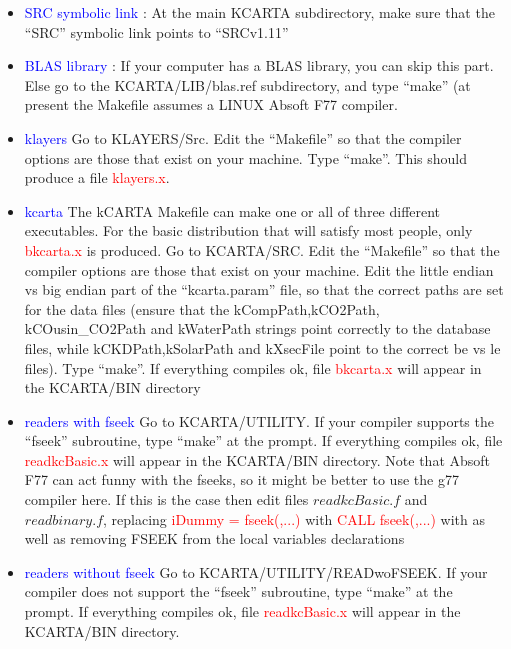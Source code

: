 \documentclass[12pt]{article}
\newcommand{\kc}{\textsf{kCARTA}\xspace}
\begin{document}
\begin{itemize}
\item \textcolor{blue} {SRC symbolic link} :  At the main KCARTA 
subdirectory, make sure that the ``SRC'' symbolic link points to ``SRCv1.11''
\item \textcolor{blue} {BLAS library} : If your computer has a BLAS library, 
you can skip this part. Else go to the KCARTA/LIB/blas.ref subdirectory, and 
type ``make'' (at present the Makefile assumes a LINUX Absoft F77 compiler.
\item \textcolor{blue} {klayers} Go to KLAYERS/Src. Edit the 
``Makefile'' so that the compiler options are those that exist on your 
machine. Type ``make''. This should produce a file \textcolor{red}{klayers.x}.
\item \textcolor{blue} {kcarta} The \kc Makefile can make one or all of 
three different executables. For the basic distribution that will satisfy 
most people, only \textcolor{red} {bkcarta.x} is produced.
Go to KCARTA/SRC. Edit the ``Makefile'' so that the 
compiler options are those that exist on your machine. Edit the little endian 
vs big endian part of the ``kcarta.param'' file, so that the correct paths
are set for the data files (ensure that the kCompPath,kCO2Path,
kCOusin\_CO2Path and kWaterPath 
strings point correctly to the database files, while kCKDPath,kSolarPath and 
kXsecFile point to the correct be vs le files). Type ``make''. If everything 
compiles ok, file \textcolor{red}{bkcarta.x} will appear in the 
KCARTA/BIN directory
\item \textcolor{blue} {readers with fseek} Go to 
KCARTA/UTILITY. If your compiler supports the  ``fseek'' subroutine, type 
``make'' at the prompt. If everything compiles ok, 
file \textcolor{red}{readkcBasic.x} will appear in the KCARTA/BIN directory.
Note that Absoft F77 can act funny with the fseeks, so it might be better to 
use the g77 compiler here. If this is the case then edit files 
$readkcBasic.f$ and $readbinary.f$, replacing 
\textcolor{red}{iDummy = fseek(,...)} with
\textcolor{red}{CALL fseek(,...)} with
as well as removing FSEEK from the local variables declarations
\item \textcolor{blue} {readers without fseek} Go to 
KCARTA/UTILITY/READwoFSEEK. If your compiler does not support the 
``fseek'' subroutine, type ``make'' at the prompt. If everything compiles ok, 
file \textcolor{red}{readkcBasic.x} will appear in the KCARTA/BIN directory.
\end{itemize}
\end{document}
